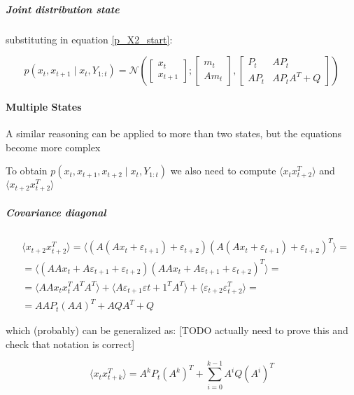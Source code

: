 \documentclass{article}
\newcommand{\E}[1]{\langle #1 \rangle} %
\newcommand{\norm}[3]{\mathcal{N}\left(#1; #2, #3\right)}
\begin{document}
\subparagraph{Joint distribution state}

substituting in equation \ref{p_X2_start}:

\begin{equation}\label{p_X2_final}
p(x_t, x_{t+1}\mid x_t, Y_{1:t}) = \norm{\begin{bmatrix}x_t\\x_{t+1}\end{bmatrix}}{\begin{bmatrix}m_t\\Am_t\end{bmatrix}}
{\begin{bmatrix}P_t & AP_t\\AP_t & AP_tA^T + Q\end{bmatrix}}
\end{equation}

\paragraph{Multiple States} A similar reasoning can be applied to more than two states, but the equations become more complex

To obtain $p(x_t, x_{t+1}, x_{t+2} \mid x_t, Y_{1:t})$ we also need to compute $\E{x_tx_{t+2}^T}$ and $\E{x_{t+2}x_{t+2}^T}$

\subparagraph{Covariance diagonal}

\begin{equation}\label{eq:cov_x_t_x_t2}
\begin{split}
    &\E{x_{t+2}x_{t+2}^T} = \E{(A(Ax_t + \varepsilon_{t+1}) + \varepsilon_{t+2})(A(Ax_t + \varepsilon_{t+1}) + \varepsilon_{t+2})^T} =\\
    &=\E{(AAx_t + A\varepsilon_{t+1} + \varepsilon_{t+2})(AAx_t + A\varepsilon_{t+1} + \varepsilon_{t+2})^T}=\\
    &=\E{AAx_tx_t^TA^TA^T} + \E{A\varepsilon_{t+1}\varepsilon{t+1}^TA^T} + \E{\varepsilon_{t+2}\varepsilon_{t+2}^T}=\\
    &=AAP_t(AA)^T + AQA^T + Q
\end{split}
\end{equation}

which (probably) can be generalized as: [TODO actually need to prove this and check that notation is correct]

\begin{equation}
    \E{x_tx_{t+k}^T} = A^kP_t(A^k)^T + \sum_{i=0}^{k-1} A^iQ(A^i)^T
\end{equation}
\end{document}

